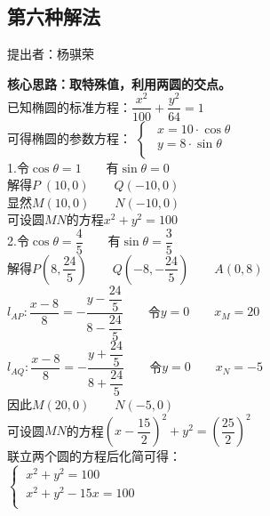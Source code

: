 \documentclass[UTF8]{ctexart}
\begin{document}
\subsection{第六种解法}
    \begin{center}
        提出者：杨骐荣
    \end{center}
    \begin{multicols}{2}
        \small
        \textbf{核心思路：取特殊值，利用两圆的交点。}\\[4mm]
        已知椭圆的标准方程：$\dfrac{x^2}{100}+\dfrac{y^2}{64}=1$\\[5mm]
        可得椭圆的参数方程：
        \begin{math}
            \begin{cases}
                ~~x=10\cdot\cos{\theta}\\[1mm]
                ~~y=8\cdot\sin{\theta}\\[1mm]
            \end{cases}
        \end{math}\\[8mm]
        1.令$\cos{\theta}=1$~~~~有$\sin{\theta}=0$\\[5mm]
        解得$P\;(10,0)$~~~~$Q(-10,0)$\\[5mm]
        显然$M(10,0)$~~~~$N(-10,0)$\\[5mm]
        可设圆$MN$的方程$x^2+y^2=100$\\[12mm]
        2.令$\cos{\theta}=\dfrac{4}{5}$~~~~有$\sin{\theta}=\dfrac{3}{5}$\\[5mm]
        解得$P(8,\dfrac{24}{5})$~~~~$Q(-8,-\dfrac{24}{5})$~~~~$A(0,8)$\\[5mm]
        $l_{AP}:\dfrac{x-8}{8}=-\dfrac{y-\dfrac{24}{5}}{8-\dfrac{24}{5}}$~~~~令$y=0$~~~~$x_M=20$\\[5mm]
        $l_{AQ}:\dfrac{x-8}{8}=-\dfrac{y+\dfrac{24}{5}}{8+\dfrac{24}{5}}$~~~~令$y=0$~~~~$x_N=-5$\\[5mm]
        因此$M(20,0)$~~~~$N(-5,0)$\\[5mm]
        可设圆$MN$的方程$\left(x-\dfrac{15}{2}\right)^2+y^2=\left(\dfrac{25}{2}\right)^2$\\[8mm]
        联立两个圆的方程后化简可得：\\[3mm]
        \begin{math}
            \begin{cases}
                ~x^2+y^2=100\\[1mm]
                ~x^2+y^2-15x=100\\[1mm]
            \end{cases}

\end{math}
\end{multicols}
\end{document}
